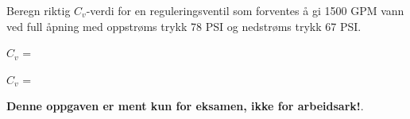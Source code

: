 

Beregn riktig $C_v$-verdi for en reguleringsventil som forventes å gi 1500 GPM vann ved full åpning med oppstrøms trykk 78 PSI og nedstrøms trykk 67 PSI.

\vskip 10pt

$C_v$ = \underbar{\hskip 50pt}







$C_v$ = 







{\bf Denne oppgaven er ment kun for eksamen, ikke for arbeidsark!}.


